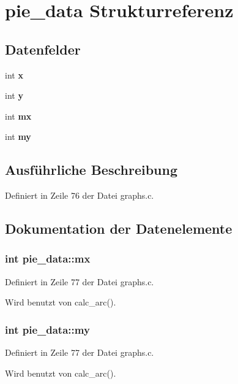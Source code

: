 \section{pie\_\-data Strukturreferenz}
\label{structpie__data}
\subsection*{Datenfelder}
\begin{CompactItemize}
\item 
int {\bf x}
\item 
int {\bf y}
\item 
int {\bf mx}
\item 
int {\bf my}
\end{CompactItemize}


\subsection{Ausf\"{u}hrliche Beschreibung}




Definiert in Zeile 76 der Datei graphs.c.

\subsection{Dokumentation der Datenelemente}
\subsubsection{\setlength{\rightskip}{0pt plus 5cm}int {\bf pie\_\-data::mx}}\label{structpie__data_0234ef9030e27eae38d77037e17871f6}




Definiert in Zeile 77 der Datei graphs.c.

Wird benutzt von calc\_\-arc().
\subsubsection{\setlength{\rightskip}{0pt plus 5cm}int {\bf pie\_\-data::my}}\label{structpie__data_63a9a5e6f1537e59becdebc9aeeb5f34}




Definiert in Zeile 77 der Datei graphs.c.

Wird benutzt von calc\_\-arc().
